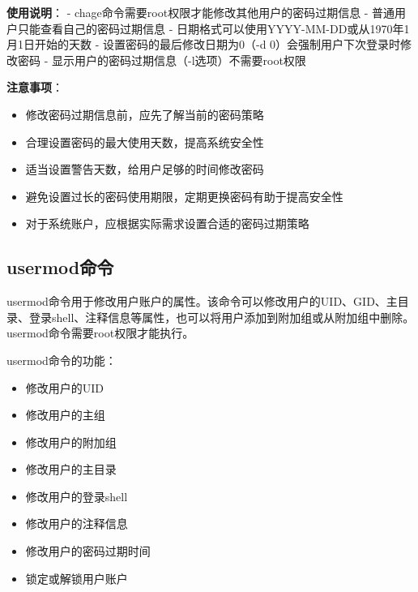 \documentclass[12pt,UTF8]{ctexbook}
\begin{document}
\textbf{使用说明}：
- chage命令需要root权限才能修改其他用户的密码过期信息
- 普通用户只能查看自己的密码过期信息
- 日期格式可以使用YYYY-MM-DD或从1970年1月1日开始的天数
- 设置密码的最后修改日期为0（-d 0）会强制用户下次登录时修改密码
- 显示用户的密码过期信息（-l选项）不需要root权限

\textbf{注意事项}：
\begin{itemize}
    \item 修改密码过期信息前，应先了解当前的密码策略
    \item 合理设置密码的最大使用天数，提高系统安全性
    \item 适当设置警告天数，给用户足够的时间修改密码
    \item 避免设置过长的密码使用期限，定期更换密码有助于提高安全性
    \item 对于系统账户，应根据实际需求设置合适的密码过期策略
\end{itemize}

\subsection{usermod命令}
usermod命令用于修改用户账户的属性。该命令可以修改用户的UID、GID、主目录、登录shell、注释信息等属性，也可以将用户添加到附加组或从附加组中删除。usermod命令需要root权限才能执行。

usermod命令的功能：
\begin{itemize}
    \item 修改用户的UID
    \item 修改用户的主组
    \item 修改用户的附加组
    \item 修改用户的主目录
    \item 修改用户的登录shell
    \item 修改用户的注释信息
    \item 修改用户的密码过期时间
    \item 锁定或解锁用户账户
\end{itemize}
\end{document}
